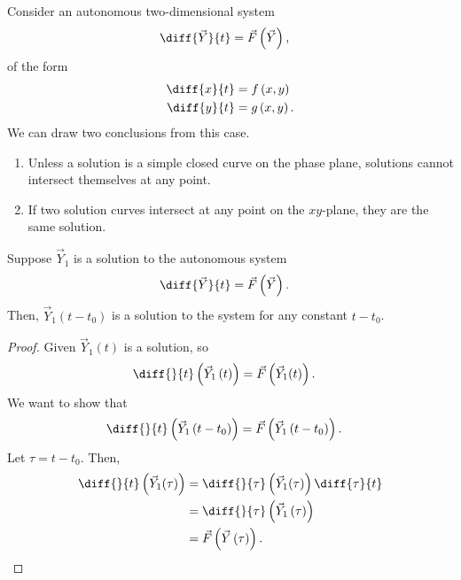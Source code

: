 \documentclass[10pt]{mypackage}
\begin{document}
\begin{example}
  Consider an autonomous two-dimensional system
  \begin{align*}
    \diff{\vec{Y}}{t} &= \vec{F}\left(\vec{Y}\right),
  \end{align*}
  of the form
  \begin{align*}
    \diff{x}{t} &= f\left(x,y\right)\\
    \diff{y}{t} &= g\left(x,y\right).
  \end{align*}
  We can draw two conclusions from this case.
  \begin{enumerate}[(1)]
    \item Unless a solution is a simple closed curve on the phase plane, solutions cannot intersect themselves at any point.
    \item If two solution curves intersect at any point on the $xy$-plane, they are the same solution.
  \end{enumerate}
  \begin{lemma}
    Suppose $\vec{Y}_1$ is a solution to the autonomous system
    \begin{align*}
      \diff{\vec{Y}}{t} &= \vec{F}\left(\vec{Y}\right).
    \end{align*}
    Then, $\vec{Y}_1\left(t-t_0\right)$ is a solution to the system for any constant $t-t_0$.
  \end{lemma}
  \begin{proof}
    Given $\vec{Y}_1(t)$ is a solution, so
    \begin{align*}
      \diff{}{t}\left(\vec{Y}_1\left(t\right)\right) &= \vec{F}\left(\vec{Y}_1(t)\right). 
    \end{align*}
    We want to show that
    \begin{align*}
      \diff{}{t} \left(\vec{Y}_1\left(t-t_0\right)\right) &= \vec{F}\left(\vec{Y}_1\left(t-t_0\right)\right).
    \end{align*}
    Let $\tau = t-t_0$. Then,
    \begin{align*}
      \diff{}{t}\left(\vec{Y}_1(\tau)\right) &= \diff{}{\tau}\left(\vec{Y}_1(\tau)\right)\diff{\tau}{t}\\
                                             &= \diff{}{\tau}\left(\vec{Y}_1\left(\tau\right)\right)\\
                                             &= \vec{F}\left(\vec{Y}\left(\tau\right)\right).
    \end{align*}
  \end{proof}
  \begin{theorem}

\end{theorem}
\end{example}
\end{document}
